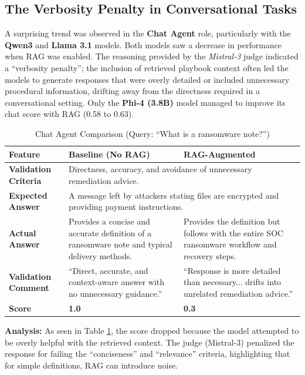 \documentclass[conference]{IEEEtran}
\begin{document}
\subsection{The Verbosity Penalty in Conversational Tasks}
A surprising trend was observed in the \textbf{Chat Agent} role, particularly with the \textbf{Qwen3} and \textbf{Llama 3.1} models. 
Both models saw a decrease in performance when RAG was enabled. The reasoning provided by the \textit{Mistral-3} judge indicated a ``verbosity penalty''; 
the inclusion of retrieved playbook context often led the models to generate responses that were overly detailed or included unnecessary procedural information, 
drifting away from the directness required in a conversational setting. Only the \textbf{Phi-4 (3.8B)} model managed to improve its chat score with RAG (0.58 to 0.63).

\begin{table}[tbp]
\centering
\caption{Chat Agent Comparison (Query: ``What is a ransomware note?'')}
\label{tab:chat_comparison}
\small
\begin{tabular}{@{} l p{7cm} p{7cm} @{}}
\toprule
\textbf{Feature} & \textbf{Baseline (No RAG)} & \textbf{RAG-Augmented} \\ \midrule
\textbf{Validation Criteria} & \multicolumn{2}{p{14.5cm}}{Directness, accuracy, and avoidance of unnecessary remediation advice.} \\ \addlinespace
\textbf{Expected Answer} & \multicolumn{2}{p{14.5cm}}{A message left by attackers stating files are encrypted and providing payment instructions.} \\ \addlinespace
\textbf{Actual Answer} & Provides a concise and accurate definition of a ransomware note and typical delivery methods. & Provides the definition but follows with the entire SOC ransomware workflow and recovery steps. \\ \addlinespace
\textbf{Validation Comment} & ``Direct, accurate, and context-aware answer with no unnecessary guidance.'' & ``Response is more detailed than necessary... drifts into unrelated remediation advice.'' \\ \addlinespace
\textbf{Score} & \textbf{1.0} & \textbf{0.3} \\ \bottomrule
\end{tabular}
\end{table}

\textbf{Analysis:} As seen in Table \ref{tab:chat_comparison}, the score dropped because the model attempted to be overly helpful with the retrieved context. 
The judge (Mistral-3) penalized the response for failing the ``conciseness'' and ``relevance'' criteria, highlighting that for simple definitions, RAG can introduce noise.
\end{document}
